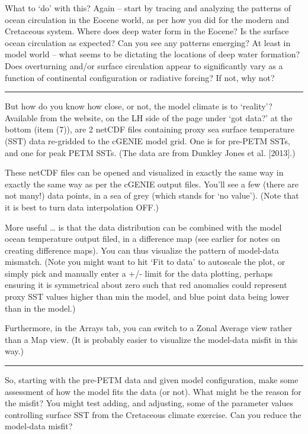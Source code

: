 \documentclass[11pt,fleqn]{book} %
\begin{document}
\noindent What to ‘do’ with this? Again – start by tracing and analyzing the patterns of ocean circulation in the Eocene world, as per how you did for the modern and Cretaceous system. Where does deep water form in the Eocene? Is the surface ocean circulation as expected?
Can you see any patterns emerging? At least in model world – what seems to be dictating the locations of deep water formation? Does overturning and/or surface circulation appear to significantly vary as a function of continental configuration or radiative forcing? If not, why not?

\vspace{1mm}
\noindent\rule{4cm}{0.1mm}
\vspace{2mm}

\noindent But how do you know how close, or not, the model climate is to ‘reality’? 
Available from the website, on the LH side of the page under ‘got data?’ at the bottom (item (7)), are 2 netCDF files containing proxy sea surface temperature (SST) data re-gridded to the cGENIE model grid. One is for pre-PETM SSTs, and one for peak PETM SSTs. (The data are from Dunkley Jones et al. [2013].)

These netCDF files can be opened and visualized in exactly the same way in exactly the same way as per the cGENIE output files. You’ll see a few (there are not many!) data points, in a sea of grey (which stands for ‘no value’). (Note that it is best to turn data interpolation OFF.)

More useful … is that the data distribution can be combined with the model ocean temperature output filed, in a difference map (see earlier for notes on creating difference maps). You can thus visualize the pattern of model-data mismatch. (Note you might want to hit ‘Fit to data’ to autoscale the plot, or simply pick and manually enter a +/- limit for the data plotting, perhaps ensuring it is symmetrical about zero such that red anomalies could represent proxy SST values higher than min the model, and blue point data being lower than in the model.)

Furthermore, in the Arrays tab, you can switch to a Zonal Average view rather than a Map view. (It is probably easier to visualize the model-data misfit in this way.)

\vspace{1mm}
\noindent\rule{4cm}{0.1mm}
\vspace{2mm}

\noindent So, starting with the pre-PETM data and given model configuration, make some assessment of how the model fits the data (or not). What might be the reason for the misfit? You might test adding, and adjusting, some of the parameter values controlling surface SST from the Cretaceous climate exercise. Can you reduce the model-data misfit?
\end{document}
